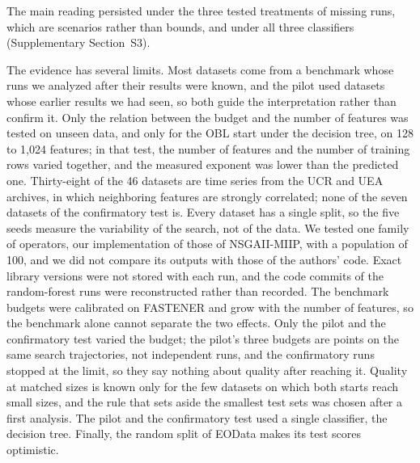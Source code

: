 The main reading persisted under the three tested treatments of missing runs, which are scenarios rather than bounds, and under all three classifiers (Supplementary Section~S3).

The evidence has several limits. Most datasets come from a benchmark whose runs we analyzed after their results were known, and the pilot used datasets whose earlier results we had seen, so both guide the interpretation rather than confirm it. Only the relation between the budget and the number of features was tested on unseen data, and only for the OBL start under the decision tree, on 128 to 1{,}024 features; in that test, the number of features and the number of training rows varied together, and the measured exponent was lower than the predicted one. Thirty-eight of the 46 datasets are time series from the UCR and UEA archives, in which neighboring features are strongly correlated; none of the seven datasets of the confirmatory test is. Every dataset has a single split, so the five seeds measure the variability of the search, not of the data. We tested one family of operators, our implementation of those of NSGAII-MIIP, with a population of 100, and we did not compare its outputs with those of the authors' code. Exact library versions were not stored with each run, and the code commits of the random-forest runs were reconstructed rather than recorded. The benchmark budgets were calibrated on FASTENER and grow with the number of features, so the benchmark alone cannot separate the two effects. Only the pilot and the confirmatory test varied the budget; the pilot's three budgets are points on the same search trajectories, not independent runs, and the confirmatory runs stopped at the limit, so they say nothing about quality after reaching it. Quality at matched sizes is known only for the few datasets on which both starts reach small sizes, and the rule that sets aside the smallest test sets was chosen after a first analysis. The pilot and the confirmatory test used a single classifier, the decision tree. Finally, the random split of EOData makes its test scores optimistic.
